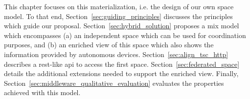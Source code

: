 This chapter focuses on this materialization, i.e. the design of our own space model.
To that end, Section~\ref{sec:guiding_principles} discusses the principles which guide our proposal.
Section~\ref{sec:hybrid_solution} proposes a mix model which encompasses
(a) an independent space which can be used for coordination purposes, and
(b) an enriched view of this space which also shows the information provided by autonomous devices.
Section~\ref{sec:align_tsc_http} describes a \ac{rest}-like \ac{api} to access the first space.
Section~\ref{sec:federated_space} details the additional extensions needed to support the enriched view.
Finally, Section~\ref{sec:middleware_qualitative_evaluation} evaluates the properties achieved with this model.






